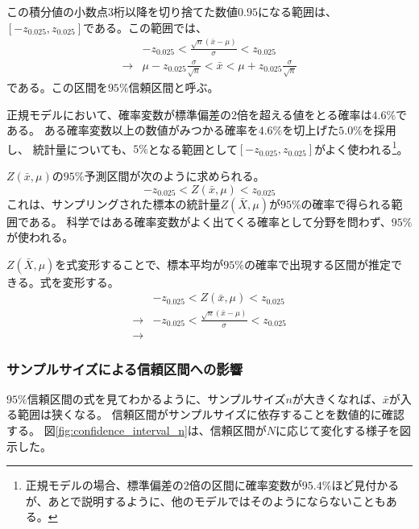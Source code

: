 この積分値の小数点$3$桁以降を切り捨てた数値$0.95$になる範囲は、$[-z_{0.025},z_{0.025}]$である。この範囲では、
\begin{eqnarray*}
 & -z_{0.025} < \frac{\sqrt{n}(\bar{x}-\mu)}{\sigma}  <z_{0.025} \\
 \rightarrow & \mu - z_{0.025} \frac{\sigma}{\sqrt{n}} < \bar{x} < \mu + z_{0.025} \frac{\sigma}{\sqrt{n}}
\end{eqnarray*}
である。この区間を$95\%$信頼区間と呼ぶ。

正規モデルにおいて、確率変数が標準偏差の$2$倍を超える値をとる確率は$4.6\%$である。
ある確率変数以上の数値がみつかる確率を$4.6\%$を切上げた$5.0\%$を採用し、
統計量についても、$5\%$となる範囲として$[-z_{0.025},z_{0.025}]$がよく使われる\footnote{正規モデルの場合、標準偏差の$2$倍の区間に確率変数が$95.4\%$ほど見付かるが、あとで説明するように、他のモデルではそのようにならないこともある。}。


$Z(\bar{x},\mu)$の$95\%$予測区間が次のように求められる。
$$
-z_{0.025}<Z(\bar{x},\mu)<z_{0.025}
$$
これは、サンプリングされた標本の統計量$Z(\bar{X},\mu)$が$95\%$の確率で得られる範囲である。
科学ではある確率変数がよく出てくる確率として分野を問わず、$95\%$が使われる。

$Z(\bar{X},\mu)$を式変形することで、標本平均が$95\%$の確率で出現する区間が推定できる。式を変形する。
\begin{eqnarray*}
    & -z_{0.025} < Z(\bar{x},\mu)<z_{0.025} \\
\rightarrow & -z_{0.025} < \frac{\sqrt{n}(\bar{x}-\mu)}{\sigma}  <z_{0.025} \\
\rightarrow & 
\end{eqnarray*}
\fi

\subsubsection{サンプルサイズによる信頼区間への影響}
$95\%$信頼区間の式を見てわかるように、サンプルサイズ$n$が大きくなれば、$\bar{x}$が入る範囲は狭くなる。
信頼区間がサンプルサイズに依存することを数値的に確認する。
図\ref{fig:confidence_interval_n}は、信頼区間が$N$に応じて変化する様子を図示した。

